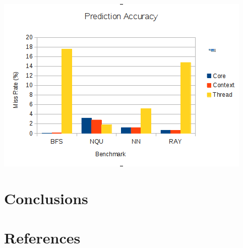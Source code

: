 \documentclass[conference]{IEEEtran}
\begin{document}
\begin{center}
	\includegraphics[width=.45\textwidth]{data.png}
\end{center}

\section{Conclusions}

\section{References}





%
%

\end{document}
